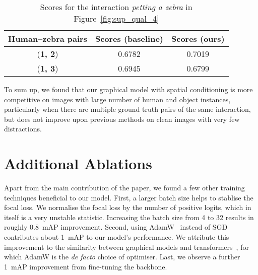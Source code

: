 \documentclass[10pt,twocolumn,letterpaper]{article}
\begin{document}
 \begin{table}[h!]\small
	\caption{Scores for the interaction \textit{petting a zebra} in Figure~\ref{fig:sup_qual_4}}
	\label{tab:sup_qual_4}
\setlength{\tabcolsep}{2pt} \begin{tabularx}{\linewidth}{c | C C }
		 \toprule
	   Human--zebra pairs & Scores (baseline) & Scores (ours) \\
	   \midrule
		 (\textbf{1, 2}) & 0.6782 & 0.7019 \\
		 (\textbf{1, 3}) & 0.6945 & 0.6799 \\
		 \bottomrule
	 \end{tabularx}
 \end{table}

 To sum up, we found that our graphical model with spatial conditioning is more competitive on images with large number of human and object instances, particularly when there are multiple ground truth pairs of the same interaction, but does not improve upon previous methods on clean images with very few distractions.

\section{Additional Ablations}

Apart from the main contribution of the paper, we found a few other training techniques beneficial to our model. First, a larger batch size helps to stablise the focal loss. We normalise the focal loss by the number of positive logits, which in itself is a very unstable statistic. Increasing the batch size from 4 to 32 results in roughly 0.8~mAP improvement. Second, using AdamW~\cite{ilya2018} instead of SGD contributes about 1~mAP to our model's performance. We attribute this improvement to the similarity between graphical models and transformers~\cite{vaswani2017}, for which AdamW is the \textit{de facto} choice of optimiser. Last, we observe a further 1~mAP improvement from fine-tuning the backbone.

\newpage
\end{document}
